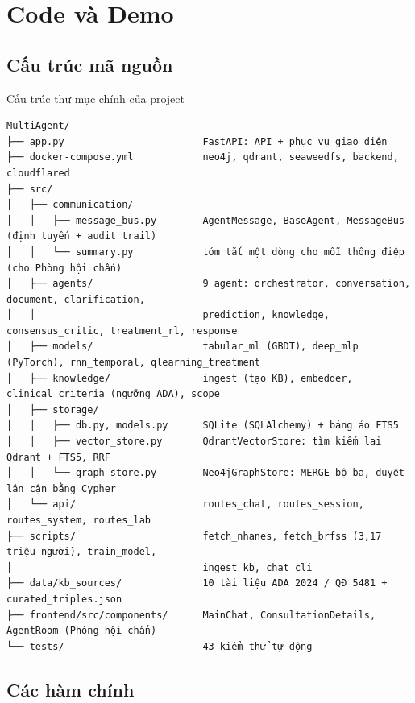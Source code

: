 \chapter{Code và Demo}
\label{chap:code}

\section{Cấu trúc mã nguồn}

\begin{code}{Cấu trúc thư mục chính của project}
\label{lst:tree}
\begin{verbatim}
MultiAgent/
├── app.py                        FastAPI: API + phục vụ giao diện
├── docker-compose.yml            neo4j, qdrant, seaweedfs, backend, cloudflared
├── src/
│   ├── communication/
│   │   ├── message_bus.py        AgentMessage, BaseAgent, MessageBus (định tuyến + audit trail)
│   │   └── summary.py            tóm tắt một dòng cho mỗi thông điệp (cho Phòng hội chẩn)
│   ├── agents/                   9 agent: orchestrator, conversation, document, clarification,
│   │                             prediction, knowledge, consensus_critic, treatment_rl, response
│   ├── models/                   tabular_ml (GBDT), deep_mlp (PyTorch), rnn_temporal, qlearning_treatment
│   ├── knowledge/                ingest (tạo KB), embedder, clinical_criteria (ngưỡng ADA), scope
│   ├── storage/
│   │   ├── db.py, models.py      SQLite (SQLAlchemy) + bảng ảo FTS5
│   │   ├── vector_store.py       QdrantVectorStore: tìm kiếm lai Qdrant + FTS5, RRF
│   │   └── graph_store.py        Neo4jGraphStore: MERGE bộ ba, duyệt lân cận bằng Cypher
│   └── api/                      routes_chat, routes_session, routes_system, routes_lab
├── scripts/                      fetch_nhanes, fetch_brfss (3,17 triệu người), train_model,
│                                 ingest_kb, chat_cli
├── data/kb_sources/              10 tài liệu ADA 2024 / QĐ 5481 + curated_triples.json
├── frontend/src/components/      MainChat, ConsultationDetails, AgentRoom (Phòng hội chẩn)
└── tests/                        43 kiểm thử tự động
\end{verbatim}
\end{code}

\section{Các hàm chính}

